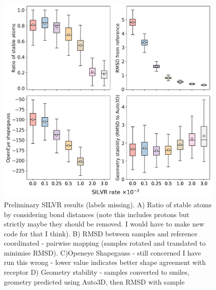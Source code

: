 \documentclass[journal=jacsat,manuscript=article]{achemso}
\begin{document}
\begin{figure}
    \centering
    \includegraphics[width=\textwidth]{Figures/silvr_plots.png}
    \caption{Preliminary SILVR results (labels missing). A) Ratio of stable atoms by considering bond distances (note this includes protons but strictly maybe they should be removed. I would have to make new code for that I think). B) RMSD between samples and reference coordinated - pairwise mapping (samples rotated and translated to minimise RMSD). C)Openeye Shapegauss - still concerned I have run this wrong - lower value indicates better shape agreement with receptor D) Geometry stability - samples converted to smiles, geometry predicted using Auto3D, then RMSD with sample}
    \label{fig:fig_3}
\end{figure}
\end{document}
